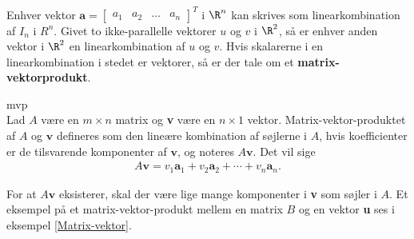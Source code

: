 %
%
Enhver vektor 
$
\textbf{a}=
\begin{bmatrix}
a_1 & a_2 & \ldots & a_n
\end{bmatrix}^T
$
i $\R^n$ kan skrives som linearkombination af $I_n$ i $R^n$. 
Givet to ikke-parallelle vektorer $u$ og $v$ i $\R^2$, så er enhver anden vektor i $\R^2$ en linearkombination af $u$ og $v$. 
Hvis skalarerne i en linearkombination i stedet er vektorer, så er der tale om et \textbf{matrix-vektorprodukt}.

\begin{defn}{}{mvp}
\phantom{gdfs}\\
Lad $A$ være en $m \times n$ matrix og \textbf{v} være en $n \times 1$ vektor. 
Matrix-vektor-produktet af $A$ og $\textbf{v}$ defineres som den lineære kombination af søjlerne i $A$, hvis koefficienter er de tilsvarende komponenter af $\textbf{v}$, og noteres $A\textbf{v}$. 
Det vil sige
\begin{align*}
A\textbf{v} =v_1\textbf{a}_1 + v_2\textbf{a}_2 + \cdots + v_n\textbf{a}_n.
\end{align*}
\end{defn}
\noindent
For at $A\textbf{v}$ eksisterer, skal der være lige mange komponenter i \textbf{v} som søjler i $A$. Et eksempel på et matrix-vektor-produkt mellem en matrix $B$ og en vektor \textbf{u} ses i eksempel \ref{Matrix-vektor}.
\\
%
